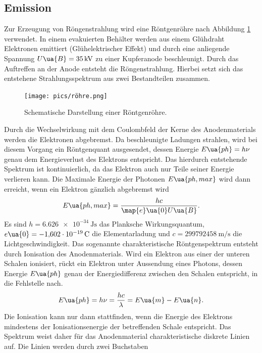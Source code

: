 \subsection{Emission}
Zur Erzeugung von Röngenstrahlung wird eine Röntgenröhre nach Abbildung \ref{fig: röhre} verwendet. In einem
evakuierten Behälter werden aus einem Glühdraht Elektronen emittiert (Glühelektrischer Effekt) und durch eine
anliegende Spannung $U\ua{B}=\SI{35}{\kilo\volt}$ zu einer Kupferanode beschleunigt. Durch das Auftreffen an der Anode
entsteht die Röngenstrahlung. Hierbei setzt sich das entstehene Strahlungsspektrum aus zwei
Bestandteilen zusammen.\\
\begin{figure}
  \centering
  \texttt{[image: pics/röhre.png]}
  \caption{Schematische Darstellung einer Röntgenröhre\cite{anleitung602i}.}
  \label{fig: röhre}
\end{figure}
Durch die Wechselwirkung mit dem Coulombfeld der Kerne des Anodenmaterials werden die Elektronen abgebremst. Da beschleunigte Ladungen strahlen,
wird bei diesem
Vorgang ein Röntgenquant ausgesendet, dessen Energie $E\ua{ph} = h\nu$ genau dem Energieverlust des Elektrons
entspricht. Das hierdurch entstehende Spektrum ist kontinuierlich, da das Elektron auch nur Teile seiner
Energie verlieren kann. Die Maximale Energie der Photonen $E\ua{ph, max}$ wird dann erreicht,
wenn ein Elektron gänzlich abgebremst wird
\begin{equation}
  E\ua{ph, max} = \frac{h c}{\map{e}\ua{0}U\ua{B}}.
  \label{eq: E_max}
\end{equation}
Es sind $h=\SI{6.626e-34}{\joule\second}$ das Planksche Wirkungsquantum, $e\ua{0}=\SI{-1.602e-19}{\coulomb}$ die Elementarladung und
$c=\SI{299792458}{\meter\per\second}$ die Lichtgeschwindigkeit.
Das sogenannte charakteristische Röntgenspektrum entsteht durch Ionisation des Anodenmaterials.
Wird ein Elektron aus einer der unteren Schalen ionisiert, rückt ein Elektron unter Aussendung eines
Photons, dessen Energie $E\ua{ph}$ genau der Energiedifferenz zwischen den Schalen entspricht, in die Fehlstelle nach.
\begin{equation}
  E\ua{ph} = h\nu = \frac{h c}{\lambda} = E\ua{m} - E\ua{n}.
  \label{eq: photonenenergie}
\end{equation}
Die Ionisation kann nur dann stattfinden, wenn die Energie des Elektrons mindestens der Ionisationsenergie der betreffenden Schale entspricht.
Das Spektrum weist daher für das Anodenmaterial charakteristische diskrete Linien auf. Die Linien werden durch zwei Buchstaben
